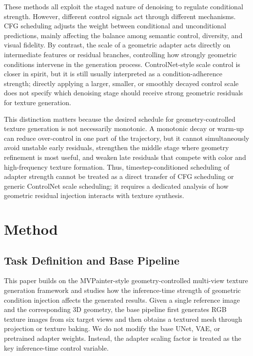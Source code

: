 \documentclass[times,twocolumn,final]{elsarticle}
\begin{document}
These methods all exploit the staged nature of denoising to regulate conditional strength. However, different control signals act through different mechanisms. CFG scheduling adjusts the weight between conditional and unconditional predictions, mainly affecting the balance among semantic control, diversity, and visual fidelity. By contrast, the scale of a geometric adapter acts directly on intermediate features or residual branches, controlling how strongly geometric conditions intervene in the generation process. ControlNet-style scale control is closer in spirit, but it is still usually interpreted as a condition-adherence strength; directly applying a larger, smaller, or smoothly decayed control scale does not specify which denoising stage should receive strong geometric residuals for texture generation.

This distinction matters because the desired schedule for geometry-controlled texture generation is not necessarily monotonic. A monotonic decay or warm-up can reduce over-control in one part of the trajectory, but it cannot simultaneously avoid unstable early residuals, strengthen the middle stage where geometry refinement is most useful, and weaken late residuals that compete with color and high-frequency texture formation. Thus, timestep-conditioned scheduling of adapter strength cannot be treated as a direct transfer of CFG scheduling or generic ControlNet scale scheduling; it requires a dedicated analysis of how geometric residual injection interacts with texture synthesis.

\section{Method}
\label{sec:method}

\subsection{Task Definition and Base Pipeline}
\label{subsec:task}

This paper builds on the MVPainter-style geometry-controlled multi-view texture generation framework \cite{shao2025mvpainter} and studies how the inference-time strength of geometric condition injection affects the generated results. Given a single reference image and the corresponding 3D geometry, the base pipeline first generates RGB texture images from six target views and then obtains a textured mesh through projection or texture baking. We do not modify the base UNet, VAE, or pretrained adapter weights. Instead, the adapter scaling factor is treated as the key inference-time control variable.
\end{document}
